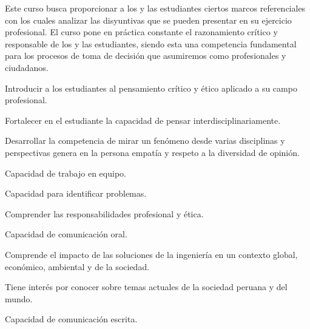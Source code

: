 \begin{syllabus}


\begin{justification}
Este curso busca proporcionar a los y las estudiantes ciertos marcos referenciales con los cuales analizar las disyuntivas que se pueden presentar en su ejercicio profesional. 
El curso pone en práctica constante el razonamiento crítico y responsable de los  y las estudiantes, siendo esta una competencia fundamental para los procesos de toma de decisión que asumiremos como profesionales y ciudadanos.
\end{justification}
\begin{goals}
\item Introducir a los estudiantes al pensamiento crítico y ético aplicado a su campo profesional.
\item Fortalecer en el estudiante la capacidad de pensar interdisciplinariamente.
\item Desarrollar la competencia de mirar un fenómeno desde varias disciplinas y perspectivas genera en la persona empatía y respeto a la diversidad de opinión.
\item Capacidad de trabajo en equipo.
\item Capacidad para identificar problemas.
\item Comprender las responsabilidades profesional y ética.
\item Capacidad de comunicación oral.
\item Comprende el impacto de las soluciones de la ingeniería en un contexto global, económico, ambiental y de la sociedad.
\item Tiene interés por conocer sobre temas actuales de la sociedad peruana y del mundo.
\item Capacidad de comunicación escrita.
\end{goals}
\begin{outcomes}
\end{outcomes}
\begin{competences}
    \item {}
    \item {}
    \item {}
    \item {}
\end{competences}

\end{syllabus}
